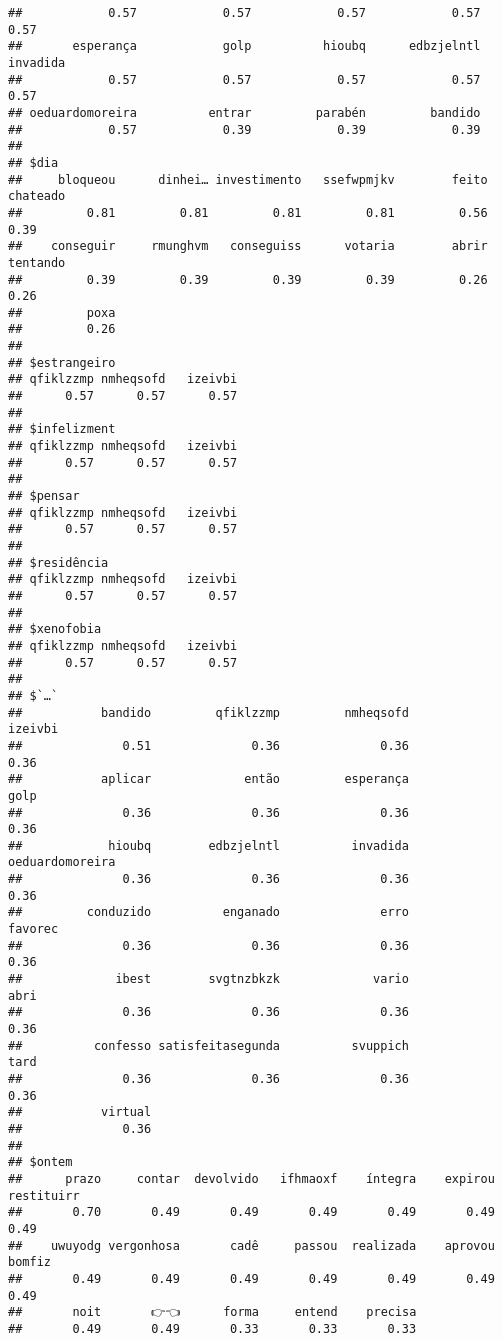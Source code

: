 \documentclass[
]{article}
\begin{document}
\begin{verbatim}
##            0.57            0.57            0.57            0.57            0.57 
##       esperança            golp          hioubq      edbzjelntl        invadida 
##            0.57            0.57            0.57            0.57            0.57 
## oeduardomoreira          entrar         parabén         bandido 
##            0.57            0.39            0.39            0.39 
## 
## $dia
##     bloqueou      dinhei… investimento   ssefwpmjkv        feito     chateado 
##         0.81         0.81         0.81         0.81         0.56         0.39 
##    conseguir     rmunghvm   conseguiss      votaria        abrir     tentando 
##         0.39         0.39         0.39         0.39         0.26         0.26 
##         poxa 
##         0.26 
## 
## $estrangeiro
## qfiklzzmp nmheqsofd   izeivbi 
##      0.57      0.57      0.57 
## 
## $infelizment
## qfiklzzmp nmheqsofd   izeivbi 
##      0.57      0.57      0.57 
## 
## $pensar
## qfiklzzmp nmheqsofd   izeivbi 
##      0.57      0.57      0.57 
## 
## $residência
## qfiklzzmp nmheqsofd   izeivbi 
##      0.57      0.57      0.57 
## 
## $xenofobia
## qfiklzzmp nmheqsofd   izeivbi 
##      0.57      0.57      0.57 
## 
## $`…`
##           bandido         qfiklzzmp         nmheqsofd           izeivbi 
##              0.51              0.36              0.36              0.36 
##           aplicar             então         esperança              golp 
##              0.36              0.36              0.36              0.36 
##            hioubq        edbzjelntl          invadida   oeduardomoreira 
##              0.36              0.36              0.36              0.36 
##         conduzido          enganado              erro           favorec 
##              0.36              0.36              0.36              0.36 
##             ibest        svgtnzbkzk             vario              abri 
##              0.36              0.36              0.36              0.36 
##          confesso satisfeitasegunda          svuppich              tard 
##              0.36              0.36              0.36              0.36 
##           virtual 
##              0.36 
## 
## $ontem
##      prazo     contar  devolvido   ifhmaoxf    íntegra    expirou restituirr 
##       0.70       0.49       0.49       0.49       0.49       0.49       0.49 
##    uwuyodg vergonhosa       cadê     passou  realizada    aprovou     bomfiz 
##       0.49       0.49       0.49       0.49       0.49       0.49       0.49 
##       noit       👉👈      forma     entend    precisa 
##       0.49       0.49       0.33       0.33       0.33 

\end{verbatim}
\end{document}
